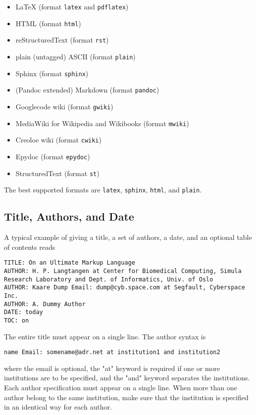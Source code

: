 \documentclass[twoside]{article}
\begin{document}
\begin{itemize}
 \item {\LaTeX} (format {\fontsize{10pt}{10pt}\verb!latex!} and {\fontsize{10pt}{10pt}\verb!pdflatex!})

 \item HTML (format {\fontsize{10pt}{10pt}\verb!html!})

 \item reStructuredText (format {\fontsize{10pt}{10pt}\verb!rst!})

 \item plain (untagged) ASCII (format {\fontsize{10pt}{10pt}\verb!plain!})

 \item Sphinx (format {\fontsize{10pt}{10pt}\verb!sphinx!})

 \item (Pandoc extended) Markdown (format {\fontsize{10pt}{10pt}\verb!pandoc!})

 \item Googlecode wiki (format {\fontsize{10pt}{10pt}\verb!gwiki!})

 \item MediaWiki for Wikipedia and Wikibooks (format {\fontsize{10pt}{10pt}\verb!mwiki!})

 \item Creoloe wiki (format {\fontsize{10pt}{10pt}\verb!cwiki!})

 \item Epydoc (format {\fontsize{10pt}{10pt}\verb!epydoc!})

 \item StructuredText (format {\fontsize{10pt}{10pt}\verb!st!})
\end{itemize}

\noindent
The best supported formats are {\fontsize{10pt}{10pt}\verb!latex!}, {\fontsize{10pt}{10pt}\verb!sphinx!}, {\fontsize{10pt}{10pt}\verb!html!}, and {\fontsize{10pt}{10pt}\verb!plain!}.

\subsection{Title, Authors, and Date}

A typical example of giving a title, a set of authors, a date,
and an optional table of contents
reads
\begin{Verbatim}
TITLE: On an Ultimate Markup Language
AUTHOR: H. P. Langtangen at Center for Biomedical Computing, Simula Research Laboratory and Dept. of Informatics, Univ. of Oslo
AUTHOR: Kaare Dump Email: dump@cyb.space.com at Segfault, Cyberspace Inc.
AUTHOR: A. Dummy Author
DATE: today
TOC: on
\end{Verbatim}
The entire title must appear on a single line.
The author syntax is
\begin{Verbatim}
name Email: somename@adr.net at institution1 and institution2
\end{Verbatim}
where the email is optional, the "at" keyword is required if one or
more institutions are to be specified, and the "and" keyword
separates the institutions. Each author specification must appear
on a single line.
When more than one author belong to the
same institution, make sure that the institution is specified in an identical
way for each author.
\end{document}
